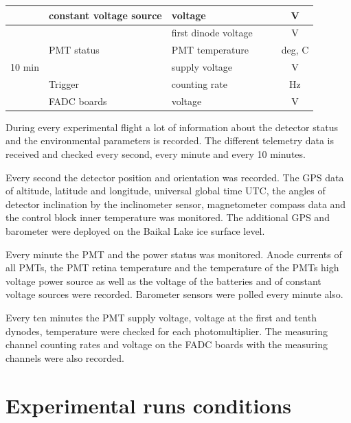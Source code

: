 \documentclass[final,5p,times,twocolumn]{elsarticle}
\begin{document}
\begin{table}[bth]
\begin{tabular}{|c|l|l|c|c|c|}
                       \cline{2-6}
                       & constant voltage source      & voltage &&& V\\
\hline
\multirow{5}{*}{10 min} & \multirow{3}{*}{PMT status} & first dinode voltage &&& V\\
                                                      \cline{3-6}
                       &                              & PMT temperature &&& deg, C\\
                                                      \cline{3-6}
                       &                              & supply voltage &&& V\\
                       \cline{2-6}
                       & Trigger                      & counting rate &&& Hz\\
                       \cline{2-6}
                       & FADC boards                  & voltage &&& V\\
\hline
\end{tabular}
\end{table}

During every experimental flight a lot of information about the detector status and the environmental parameters is recorded. The different telemetry data is received and checked every second, every minute and every 10 minutes. 

Every second the detector position and orientation was recorded. The GPS data of altitude, latitude and longitude, universal global time UTC, the angles of detector inclination by the inclinometer sensor, magnetometer compass data and the control block inner temperature was monitored. The additional GPS and barometer were deployed on the Baikal Lake ice surface level.

Every minute the PMT and the power status was monitored. Anode currents of all PMTs, the PMT retina temperature and the temperature of the PMTs high voltage power source as well as the voltage of the batteries and of constant voltage sources were recorded. Barometer sensors were polled every minute also.

Every ten minutes the PMT supply voltage, voltage at the first and tenth dynodes, temperature were checked for each photomultiplier. The measuring channel counting rates and voltage on the FADC boards with the measuring channels were also recorded.

\section{Experimental runs conditions}
\label{sect:data}
 
\end{document}
